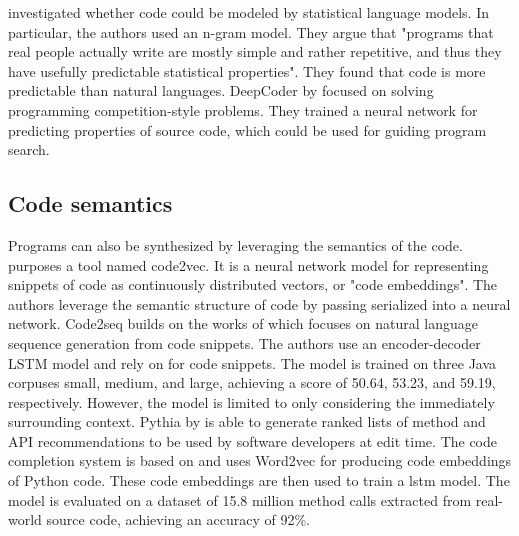 \textcite{hindle2012natural} investigated whether code could be modeled by statistical language models. In particular, the authors used an n-gram model. They argue that "programs that real people actually write are mostly simple and rather repetitive, and thus they have usefully predictable statistical properties". They found that code is more predictable than natural languages. DeepCoder by \textcite{balog2017deepcoder} focused on solving programming competition-style problems. They trained a neural network for predicting properties of source code, which could be used for guiding program search.

\subsection{Code semantics}
Programs can also be synthesized by leveraging the semantics of the code. \textcite{alon2018code2vec} purposes a tool named code2vec. It is a neural network model for representing snippets of code as continuously distributed vectors, or "code embeddings". The authors leverage the semantic structure of code by passing serialized  into a neural network. Code2seq \cite{alon2018code2seq} builds on the works of \textcite{alon2018code2vec} which focuses on natural language sequence generation from code snippets. The authors use an encoder-decoder LSTM model and rely on  for code snippets. The model is trained on three Java corpuses small, medium, and large, achieving a  score of 50.64, 53.23, and 59.19, respectively. However, the model is limited to only considering the immediately surrounding context. Pythia by \textcite{svyatkovskiy2019pyhia} is able to generate ranked lists of method and API recommendations to be used by software developers at edit time. The code completion system is based on  and uses Word2vec for producing code embeddings of Python code. These code embeddings are then used to train a \gls{lstm} model. The model is evaluated on a dataset of 15.8 million method calls extracted from real-world source code, achieving an accuracy of 92\%.

